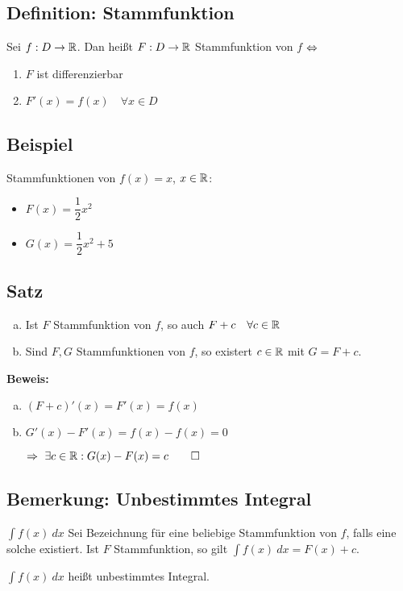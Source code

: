 \documentclass[10pt, a4paper, fleqn]{article}
\begin{document}
\subsection{Definition: Stammfunktion}
Sei $f: D \to \mathbb{R}$. Dan heißt $F: D \to \mathbb{R}$ Stammfunktion von $f$
$\Leftrightarrow$
\begin{enumerate}[1.]
    \item $F$ ist differenzierbar
    \item $F'(x) = f(x) \quad \forall x \in D$
\end{enumerate}

\subsection{Beispiel}
Stammfunktionen von $f(x) = x$, $x \in \mathbb{R}$:
\begin{itemize}
    \item $F(x) = \dfrac{1}{2}x^2$
    \item $G(x) = \dfrac{1}{2}x^2 + 5$
\end{itemize}

\subsection{Satz}
\begin{enumerate}[a)]
    \item Ist $F$ Stammfunktion von $f$, so auch $F + c \quad \forall c \in \mathbb{R}$
    \item Sind $F, G$ Stammfunktionen von $f$, so existert $c \in \mathbb{R}$ mit $G = F + c$.
\end{enumerate}
\textbf{Beweis: }

\begin{enumerate}[a)]
    \item $(F + c)'(x) = F'(x) = f(x)$
    \item $G'(x) - F'(x) = f(x) - f(x) = 0$

    $\Rightarrow \ \exists c \in \mathbb{R}: G(x) - F(x) = c \qed$
\end{enumerate}

\subsection{Bemerkung: Unbestimmtes Integral}
$\int f(x) \:dx$ Sei Bezeichnung für eine beliebige Stammfunktion von $f$,
falls eine solche existiert. Ist $F$ Stammfunktion, so gilt
$\int f(x) \:dx = F(x) + c$.

$\int f(x) \:dx$ heißt unbestimmtes Integral.
\end{document}
